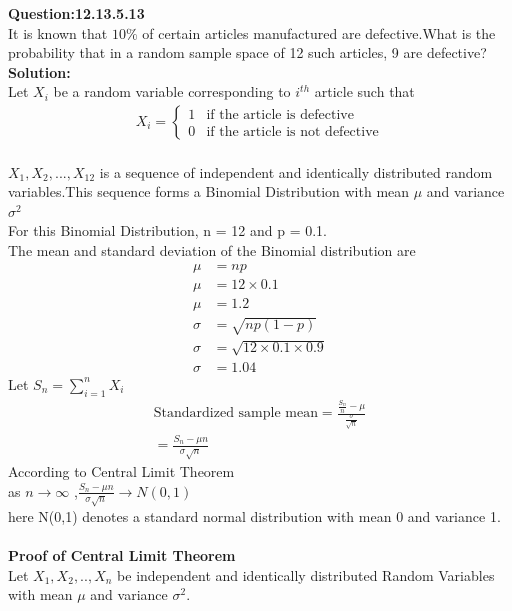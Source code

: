 \documentclass[journal,12pt,twocolumn]{IEEEtran}
\begin{document}
\textbf{Question:12.13.5.13}\\
 	It is known that $ 10\% $ of certain articles manufactured are defective.What is the probability that in a random sample space of 12 such articles, 9 are defective?
\\
 \textbf{Solution:}
 \\
Let $X_i$ be a random variable corresponding to $i^{th}$ article such that
\begin{align}
        X_i=  
        \begin{cases}
            1 &  \text{if the article is defective} \\
            0 &  \text{if the article is not defective}
        \end{cases}
    \end{align}
\\$X_1,X_2,...,X_{12}$ is a sequence of independent and identically distributed random variables.This sequence forms a Binomial Distribution with mean $\mu$ and variance $\sigma^2$
 \\For this Binomial Distribution, n = 12 and p = 0.1.
 \\The mean and standard deviation of the Binomial distribution are
 \begin{align}
    \mu &= np\\
    \mu &= 12\times0.1\nonumber\\
    \mu &= 1.2\\
    \sigma&= \sqrt{np(1-p)}\\
    \sigma&= \sqrt{12\times0.1\times0.9}\nonumber\\
    \sigma&= 1.04
    \end{align}
Let $S_n = \sum_{i=1}^{n} X_i$
\begin{align}
      \text{Standardized sample mean} = \frac{\frac{S_n}{n}-\mu}{\frac{\sigma}{\sqrt{n}}}\nonumber \\
      = \frac{S_n-\mu{n}}{\sigma{\sqrt{n}}} 
    \end{align}
According to Central Limit Theorem
\\as $n \to \infty$ ,$\frac{S_n -\mu{n}}{\sigma{\sqrt{n}}} \to N(0,1)$
\\here N(0,1) denotes a standard normal distribution with mean 0 and variance 1.
\\\\\textbf{Proof of Central Limit Theorem}
\\Let $X_1,X_2,..,X_n$ be independent and identically distributed Random Variables with mean $\mu$ and variance $\sigma^2$.
\end{document}
